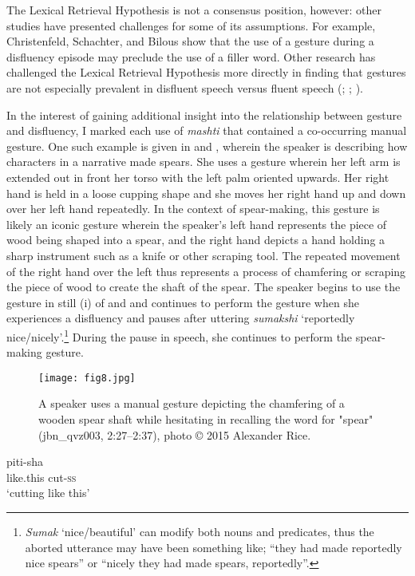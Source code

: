 \documentclass[output=paper]{langscibook}
\begin{document}
The Lexical Retrieval Hypothesis is not a consensus position, however: other studies have presented challenges for some of its assumptions. For example, Christenfeld, Schachter, and Bilous \citeyear{Christenfeld1991} show that the use of a gesture during a disfluency episode may preclude the use of a filler word. Other research has challenged the Lexical Retrieval Hypothesis more directly in finding that gestures are not especially prevalent in disfluent speech versus fluent speech (\citealt{Graziano2018}; \citealt{Hoetjes2014}; \citealt{Kisa2022}).

In the interest of gaining additional insight into the relationship between gesture and disfluency, I marked each use of \textit{mashti} that contained a co-occurring manual gesture. One such example is given in  and , wherein the speaker is describing how characters in a narrative made spears. She uses a gesture wherein her left arm is extended out in front her torso with the left palm oriented upwards. Her right hand is held in a loose cupping shape and she moves her right hand up and down over her left hand repeatedly. In the context of spear-making, this gesture is likely an iconic gesture wherein the speaker’s left hand represents the piece of wood being shaped into a spear, and the right hand depicts a hand holding a sharp instrument such as a knife or other scraping tool. The repeated movement of the right hand over the left thus represents a process of chamfering or scraping the piece of wood to create the shaft of the spear. The speaker begins to use the gesture in still (i) of  and  and continues to perform the gesture when she experiences a disfluency and pauses after uttering \textit{sumakshi} ‘reportedly nice/nicely’.\footnote{\textit{Sumak} ‘nice/beautiful’ can modify both nouns and predicates, thus the aborted utterance may have been something like; “they had made reportedly nice spears” or “nicely they had made spears, reportedly”.} During the pause in speech, she continues to perform the spear-making gesture. 

  
\begin{figure}
\texttt{[image: fig8.jpg]}
 \caption{\label{fig:rice:8} A speaker uses a manual gesture depicting the chamfering of a wooden spear shaft while hesitating in recalling the word for "spear" (jbn\_qvz003, 2:27--2:37), photo © 2015 Alexander Rice.}
\end{figure}

\ea%
\label{ex:rice:29}
\ea   \label{ex:rice:29a}
 {piti-sha}\\
{like.this}  {cut-\textsc{ss}}\\
\glt ‘cutting like this’
\medskip
\end{document}
